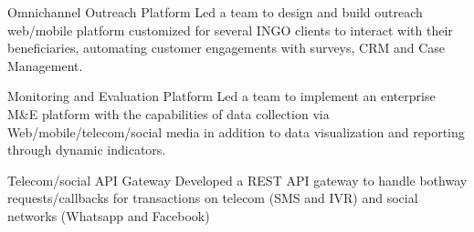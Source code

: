 
\begin{cvdesc}

  \cvdesch
    {Omnichannel Outreach Platform} %
    {Led a team to design and build outreach web/mobile platform customized for several INGO clients to interact with their beneficiaries, automating customer engagements with surveys, CRM and Case Management.}
    
  \cvdesch
    {Monitoring and Evaluation Platform} %
    {Led a team to implement an enterprise M\&E platform with the capabilities of data collection via Web/mobile/telecom/social media in addition to data visualization and reporting through dynamic indicators.}
    
  \cvdesch
    {Telecom/social API Gateway} %
    {Developed a REST API gateway to handle bothway requests/callbacks for transactions on telecom (SMS and IVR) and social networks (Whatsapp and Facebook)}

\end{cvdesc}
